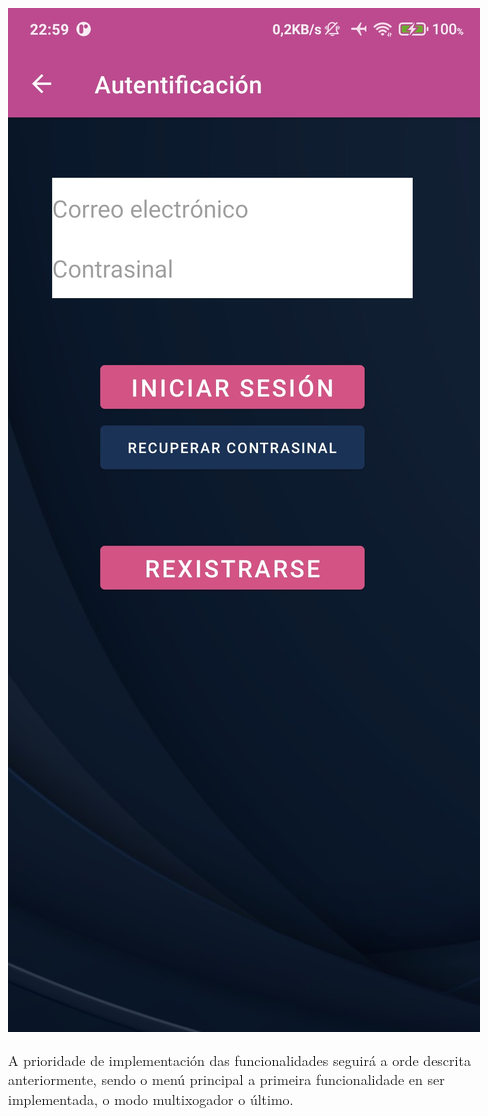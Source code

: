 \begin{center}
\includegraphics[scale=0.105]{imaxes/auth.jpg}\\[30 pt]
\end{center}
A prioridade de implementación das funcionalidades seguirá a orde descrita anteriormente, sendo o menú principal a primeira funcionalidade en ser implementada, o modo multixogador o último.\\
